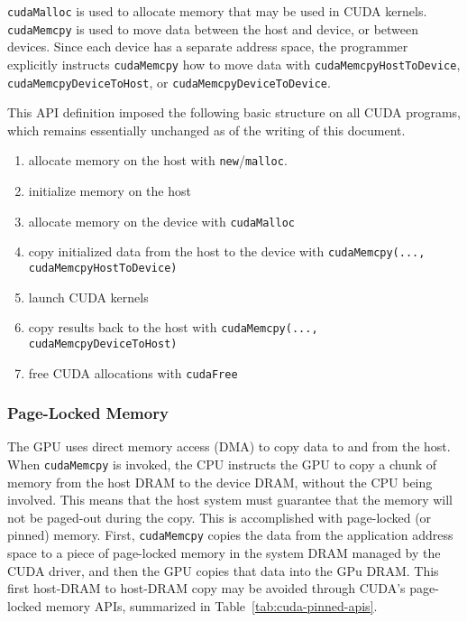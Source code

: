 \texttt{cudaMalloc} is used to allocate memory that may be used in CUDA kernels.
\texttt{cudaMemcpy} is used to move data between the host and device, or between devices.
Since each device has a separate address space, the programmer explicitly instructs \texttt{cudaMemcpy} how to move data with \texttt{cudaMemcpyHostToDevice}, \texttt{cudaMemcpyDeviceToHost}, or \texttt{cudaMemcpyDeviceToDevice}.

This API definition imposed the following basic structure on all CUDA programs, which remains essentially unchanged as of the writing of this document.
\begin{enumerate}
    \item allocate memory on the host with \texttt{new}/\texttt{malloc}.
    \item initialize memory on the host
    \item allocate memory on the device with \texttt{cudaMalloc}
    \item copy initialized data from the host to the device with \texttt{cudaMemcpy(..., cudaMemcpyHostToDevice)}
    \item launch CUDA kernels
    \item copy results back to the host with \texttt{cudaMemcpy(..., cudaMemcpyDeviceToHost)}
    \item free CUDA allocations with \texttt{cudaFree}
\end{enumerate}


\subsubsection{Page-Locked Memory}

The GPU uses direct memory access (DMA) to copy data to and from the host.
When \texttt{cudaMemcpy} is invoked, the CPU instructs the GPU to copy a chunk of memory from the host DRAM to the device DRAM, without the CPU being involved.
This means that the host system must guarantee that the memory will not be paged-out during the copy.
This is accomplished with page-locked (or pinned) memory.
First, \texttt{cudaMemcpy} copies the data from the application address space to a piece of page-locked memory in the system DRAM managed by the CUDA driver, and then the GPU copies that data into the GPu DRAM.
This first host-DRAM to host-DRAM copy may be avoided through CUDA's page-locked memory APIs, summarized in Table~\ref{tab:cuda-pinned-apis}.

